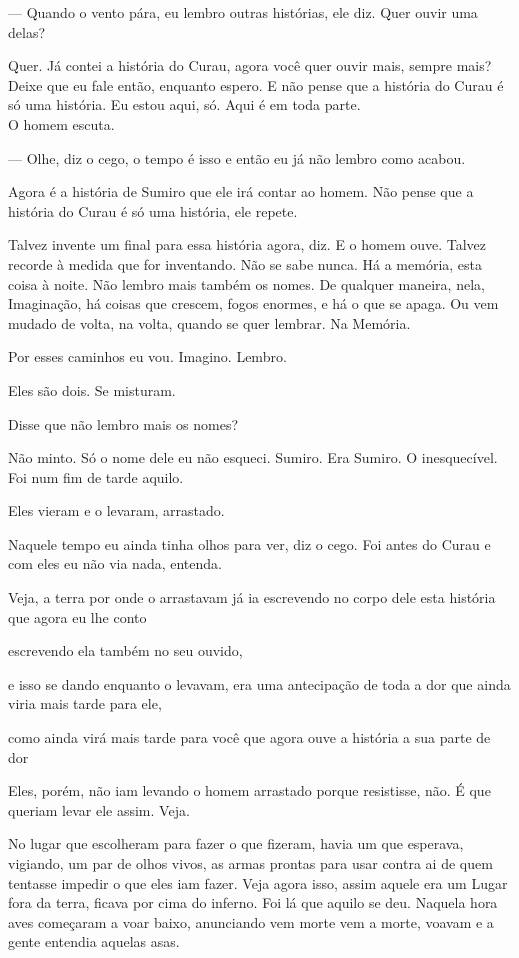 --- Quando o vento pára, eu lembro outras histórias, ele diz. Quer ouvir
uma delas?

Quer. Já contei a história do Curau, agora você quer ouvir mais, sempre
mais? Deixe que eu fale então, enquanto espero. E não pense que a
história do Curau é só uma história. Eu estou aqui, só. Aqui é em toda
parte.\\

O homem escuta.

--- Olhe, diz o cego, o tempo é isso e então eu já não lembro como acabou.

Agora é a história de Sumiro que ele irá contar ao homem. Não pense que
a história do Curau é só uma história, ele repete.

Talvez invente um final para essa história agora, diz. E o homem ouve.
Talvez recorde à medida que for inventando. Não se sabe nunca. Há a
memória, esta coisa à noite. Não lembro mais também os nomes. De
qualquer maneira, nela, Imaginação, há coisas que crescem, fogos
enormes, e há o que se apaga. Ou vem mudado de volta, na volta, quando
se quer lembrar. Na Memória.

Por esses caminhos eu vou. Imagino. Lembro.

Eles são dois. Se misturam.

Disse que não lembro mais os nomes?

Não minto. Só o nome dele eu não esqueci. Sumiro. Era Sumiro. O
inesquecível.\\

Foi num fim de tarde aquilo.

Eles vieram e o levaram, arrastado.

Naquele tempo eu ainda tinha olhos para ver, diz o cego. Foi antes do
Curau e com eles eu não via nada, entenda.

Veja, a terra por onde o arrastavam já ia escrevendo no corpo dele esta
história que agora eu lhe conto

escrevendo ela também no seu ouvido,

e isso se dando enquanto o levavam, era uma antecipação de toda a dor
que ainda viria mais tarde para ele,

como ainda virá mais tarde para você que agora ouve a história a sua
parte de dor

Eles, porém, não iam levando o homem arrastado porque resistisse, não. É
que queriam levar ele assim. Veja.

No lugar que escolheram para fazer o que fizeram, havia um que esperava,
vigiando, um par de olhos vivos, as armas prontas para usar contra ai de
quem tentasse impedir o que eles iam fazer. Veja agora isso, assim
aquele era um Lugar fora da terra, ficava por cima do inferno. Foi lá
que aquilo se deu. Naquela hora aves começaram a voar baixo, anunciando
vem morte vem a morte, voavam e a gente entendia aquelas asas.

